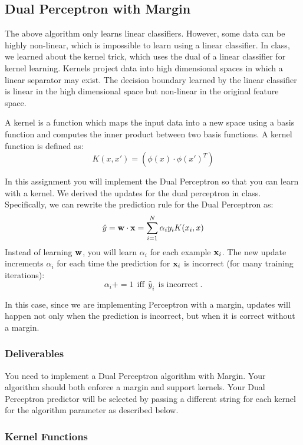 \documentclass[11pt]{article}
\newcommand{\vw}{{\bf w}}
\newcommand{\vx}{{\bf x}}
\newcommand{\vxi}{{\bf x}_i}
\newcommand{\yi}{y_i}
\newcommand{\yh}{\hat{y}}
\newcommand{\alphai}{\alpha_i}
\begin{document}
\subsection{Dual Perceptron with Margin}
The above algorithm only learns linear classifiers. However, some data can be highly non-linear, which is impossible to learn using a linear classifier. In class, we learned about the kernel trick, which uses the dual of a linear classifier for kernel learning. Kernels project data into high dimensional spaces in which a linear separator may exist. The decision boundary learned by the linear classifier is linear in the high dimensional space but non-linear in the original feature space.

A kernel is a function which maps the input data into a new space using a basis function and computes the inner product between two basis functions. A kernel function is defined as:
\[
K(x, x') = (\phi(x) \cdot \phi(x')^T)
\]

In this assignment you will implement the Dual Perceptron so that you can learn with a kernel. We derived the updates for the dual perceptron in class. Specifically, we can rewrite the prediction rule for the Dual Perceptron as:
\[
\yh = \vw \cdot \vx = \sum_{i=1}^N \alphai \yi K(x_i, x)
\]
Instead of learning $\vw$, you will learn $\alphai$ for each example $\vxi$. The new update increments $\alphai$ for each time the prediction for $\vxi$ is incorrect (for many training iterations):
\[
\alphai += 1 ~~\textrm{iff}~~ \yh_i ~~\textrm{is incorrect} ~.
\]

In this case, since we are implementing Perceptron with a margin, updates will happen not only when the prediction is incorrect, but when it
is correct without a margin.

\subsubsection{Deliverables}
You need to implement a Dual Perceptron algorithm with Margin. Your algorithm should both enforce a margin and support kernels.
Your Dual Perceptron predictor will be selected by passing a different string for each kernel for the algorithm parameter as described below.

\subsubsection{Kernel Functions}
\end{document}

